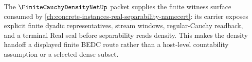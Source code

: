 The $\FiniteCauchyDensityNetUp$ packet supplies the finite witness surface consumed by \autoref{ch:concrete-instances-real-separability-namecert}: its carrier exposes explicit finite dyadic representatives, stream windows, regular-Cauchy readback, and a terminal Real seal before separability reads density. This makes the density handoff a displayed finite BEDC route rather than a host-level countability assumption or a selected dense subset.
